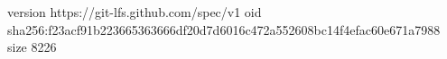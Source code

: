 version https://git-lfs.github.com/spec/v1
oid sha256:f23acf91b223665363666df20d7d6016c472a552608bc14f4efac60e671a7988
size 8226
